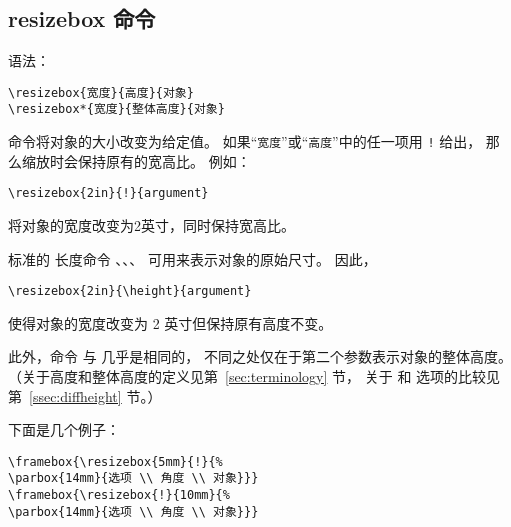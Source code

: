 \subsection{resizebox 命令}\label{ssec:resizebox}
语法：
\begin{lstlisting}
\resizebox{宽度}{高度}{对象}
\resizebox*{宽度}{整体高度}{对象}
\end{lstlisting}

 命令将对象的大小改变为给定值。
如果“\texttt{宽度}”或“\texttt{高度}”中的任一项用 \texttt{!} 给出，
那么缩放时会保持原有的宽高比。
例如：
\begin{lstlisting}
\resizebox{2in}{!}{argument}
\end{lstlisting}
将对象的宽度改变为2英寸，同时保持宽高比。

标准的 \LaTeXe{} 长度命令 、、、 可用来表示对象的原始尺寸。
因此，
\begin{lstlisting}
\resizebox{2in}{\height}{argument}
\end{lstlisting}
使得对象的宽度改变为 2 英寸但保持原有高度不变。 

此外，命令  与  几乎是相同的，
不同之处仅在于第二个参数表示对象的整体高度。
（关于高度和整体高度的定义见第~\ref{sec:terminology} 节，
关于  和  选项的比较见第~\ref{ssec:diffheight} 节。）

下面是几个例子：

\begin{center}
\begin{minipage}[b]{.4\textwidth}
	\begin{center}
		\par\vspace{0pt}
	\end{center}
\end{minipage}%
\hspace{-1cm}
\begin{minipage}[b]{.6\textwidth}
\begin{lstlisting}
\framebox{\resizebox{5mm}{!}{%
\parbox{14mm}{选项 \\ 角度 \\ 对象}}}
\framebox{\resizebox{!}{10mm}{%
\parbox{14mm}{选项 \\ 角度 \\ 对象}}}
\end{lstlisting}
\par\vspace{0pt}
\end{minipage}
\end{center}

